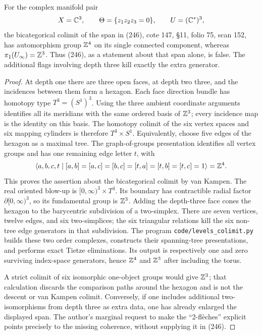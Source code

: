 \begin{proposition}\label{P5a1}
For the complex manifold pair
\[
 X=\mathbb C^3,\qquad \Theta=\{z_1z_2z_3=0\},\qquad U=(\mathbb C^*)^3,
\]
the bicategorical colimit of the span in (246), cote 147, \S11,
folio 75, scan 152, has automorphism group $\mathbb Z^4$ on its single connected
component, whereas $\pi_1(U_\infty)=\mathbb Z^3$.  Thus (246), as a statement about
that span alone, is false.  The additional flags involving depth three kill
exactly the extra generator.
\end{proposition}
\begin{proof}
At depth one there are three open faces, at depth two three, and the
incidences between them form a hexagon.  Each face direction bundle has
homotopy type $T^3=(S^1)^3$.  Using the three ambient coordinate arguments
identifies all its meridians with the same ordered basis of $\mathbb Z^3$; every
incidence map is the identity on this basis.  The homotopy colimit of the
six vertex spaces and six mapping cylinders is therefore
$T^3\times S^1$.  Equivalently, choose five edges of the hexagon as a maximal
tree.  The graph-of-groups presentation identifies all vertex groups and
has one remaining edge letter $t$, with
\[
 \langle a,b,c,t\mid [a,b]=[a,c]=[b,c]
 =[t,a]=[t,b]=[t,c]=1\rangle=\mathbb Z^4.
\]
This proves the assertion about the bicategorical colimit by van Kampen.
The real oriented blow-up is
$[0,\infty)^3\times T^3$.  Its boundary has contractible radial factor
$\partial[0,\infty)^3$, so its fundamental group is $\mathbb Z^3$.
Adding the depth-three face cones the hexagon to the barycentric
subdivision of a two-simplex.  There are seven vertices, twelve edges,
and six two-simplices; the six triangular relations kill the six
non-tree edge generators in that subdivision.  The program
\texttt{code/levels\_colimit.py} builds these two order complexes,
constructs their spanning-tree presentations, and performs exact
Tietze eliminations.  Its output is respectively one and zero surviving
index-space generators, hence $\mathbb Z^4$ and $\mathbb Z^3$ after including the torus.

A strict colimit of six isomorphic one-object groups would give $\mathbb Z^3$;
that calculation discards the comparison paths around the hexagon and
is not the descent or van Kampen colimit.  Conversely, if one includes
additional two-isomorphisms from depth three as extra data, one has
already enlarged the displayed span.  The author's marginal request to
make the ``2-fl\`eches'' explicit points precisely to the missing
coherence, without supplying it in (246).
\end{proof}

